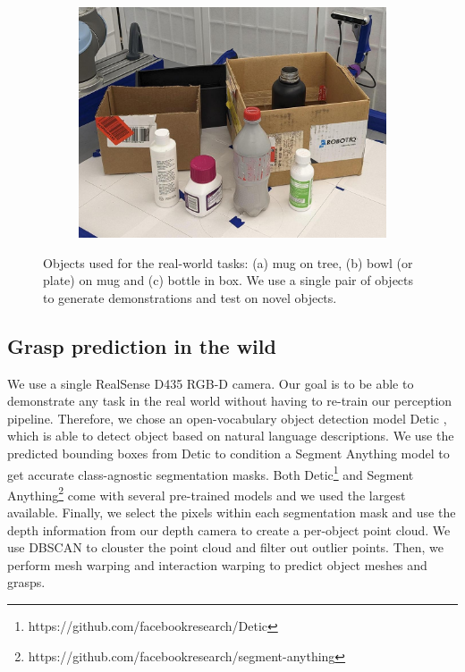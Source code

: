 \documentclass{article}
\begin{document}
\begin{figure}[]
\begin{subfigure}{(\linewidth - 0.05\linewidth)/3}
        \caption{}
    \end{subfigure}
    \begin{subfigure}{(\linewidth - 0.05\linewidth)/3}
        \centering
        \includegraphics[width=\linewidth]{figures/object_sets/bottle_in_box.jpg}
        \caption{}
    \end{subfigure}

    \caption{Objects used for the real-world tasks: (a) mug on tree, (b) bowl (or plate) on mug and (c) bottle in box. We use a single pair of objects to generate demonstrations and test on novel objects.}
    \label{fig:object_sets}
\end{figure}

\subsection{Grasp prediction in the wild}
\label{appendix:experiment:wild}

We use a single RealSense D435 RGB-D camera. Our goal is to be able to demonstrate any task in the real world without having to re-train our perception pipeline. Therefore, we chose an open-vocabulary object detection model Detic \cite{zhou22detecting}, which is able to detect object based on natural language descriptions. We use the predicted bounding boxes from Detic to condition a Segment Anything model \cite{kirillov23segment} to get accurate class-agnostic segmentation masks. Both Detic\footnote{https://github.com/facebookresearch/Detic} and Segment Anything\footnote{https://github.com/facebookresearch/segment-anything} come with several pre-trained models and we used the largest available. Finally, we select the pixels within each segmentation mask and use the depth information from our depth camera to create a per-object point cloud. We use DBSCAN to clouster the point cloud and filter out outlier points. Then, we perform mesh warping and interaction warping to predict object meshes and grasps.
\end{document}
